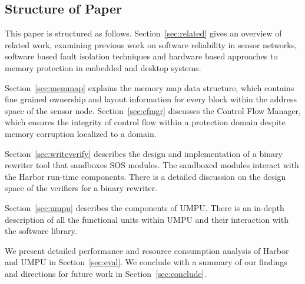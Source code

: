 \subsection{Structure of Paper}
%
This paper is structured as follows.
%
Section~\ref{sec:related} gives an overview of related work,
examining previous work on software reliability in sensor networks,
software based fault isolation techniques and hardware based
approaches to memory protection in embedded and desktop systems.
%

Section~\ref{sec:memmap} explains the memory map data structure, which
contains fine grained ownership and layout information for every block
within the address space of the sensor node. 
%
Section~\ref{sec:cfmgr} discusses the Control Flow Manager, which
ensures the integrity of control flow within a protection domain
despite memory corruption localized to a domain.

Section~\ref{sec:writeverify} describes the design and implementation
of a binary rewriter tool that sandboxes SOS modules.
%
The sandboxed modules interact with the Harbor run-time components.
%
There is a detailed discussion on the design space of the verifiers
for a binary rewriter.

Section~\ref{sec:umpu} describes the components of UMPU.
%
There is an in-depth 
description of all the functional units
within UMPU and their interaction with the software library.

We present detailed performance and resource consumption analysis of
Harbor and UMPU in Section~\ref{sec:eval}.
%
We conclude with a summary of our findings and directions for future
work in Section~\ref{sec:conclude}.
